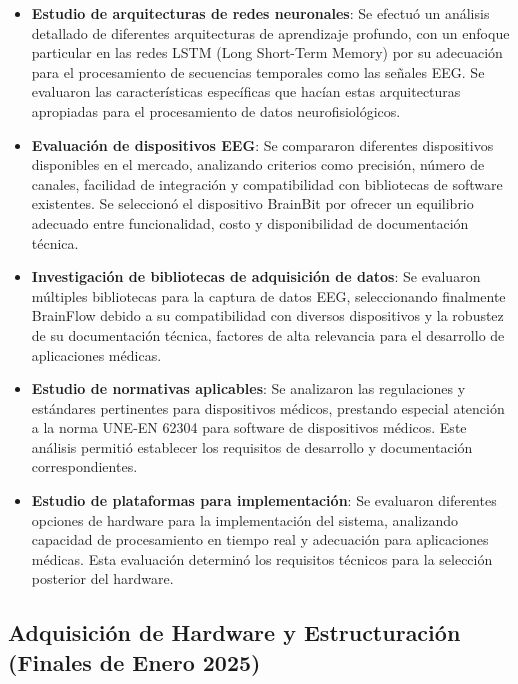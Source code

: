 \begin{itemize}
    \item \textbf{Estudio de arquitecturas de redes neuronales}: Se efectuó un análisis detallado de diferentes arquitecturas de aprendizaje profundo, con un enfoque particular en las redes LSTM (Long Short-Term Memory) por su adecuación para el procesamiento de secuencias temporales como las señales EEG. Se evaluaron las características específicas que hacían estas arquitecturas apropiadas para el procesamiento de datos neurofisiológicos.
    
    \item \textbf{Evaluación de dispositivos EEG}: Se compararon diferentes dispositivos disponibles en el mercado, analizando criterios como precisión, número de canales, facilidad de integración y compatibilidad con bibliotecas de software existentes. Se seleccionó el dispositivo BrainBit por ofrecer un equilibrio adecuado entre funcionalidad, costo y disponibilidad de documentación técnica.
    
    \item \textbf{Investigación de bibliotecas de adquisición de datos}: Se evaluaron múltiples bibliotecas para la captura de datos EEG, seleccionando finalmente BrainFlow debido a su compatibilidad con diversos dispositivos y la robustez de su documentación técnica, factores de alta relevancia para el desarrollo de aplicaciones médicas.
    
    \item \textbf{Estudio de normativas aplicables}: Se analizaron las regulaciones y estándares pertinentes para dispositivos médicos, prestando especial atención a la norma UNE-EN 62304 para software de dispositivos médicos. Este análisis permitió establecer los requisitos de desarrollo y documentación correspondientes.
    
    \item \textbf{Estudio de plataformas para implementación}: Se evaluaron diferentes opciones de hardware para la implementación del sistema, analizando capacidad de procesamiento en tiempo real y adecuación para aplicaciones médicas. Esta evaluación determinó los requisitos técnicos para la selección posterior del hardware.
\end{itemize}

\subsection{Adquisición de Hardware y Estructuración (Finales de Enero 2025)}

